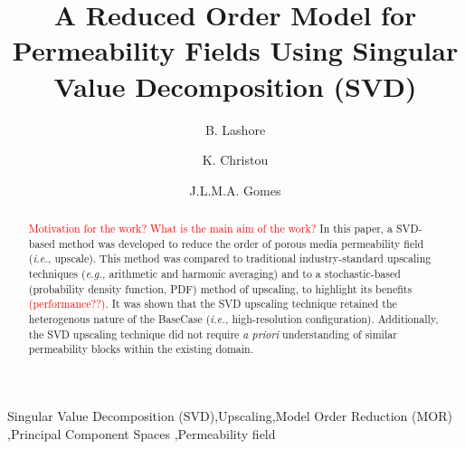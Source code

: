 \documentclass[preprint,12pt]{elsarticle}
\newcommand{\red}{\textcolor{red}}
\newcommand{\eg}{{\it e.g., }}
\newcommand{\ie}{{\it i.e., }}
\begin{document}
\begin{frontmatter}



\title{A Reduced Order Model for Permeability Fields Using Singular Value Decomposition (SVD)}
\author[UoA]{B. Lashore} \author[UoA]{K. Christou} \author[UoA]{J.L.M.A. Gomes}
\address[UoA]{Mechanics of Fluids, Soils \& Structures Research Group \\ School of Engineering, University of Aberdeen, UK}


\begin{abstract}

\red{Motivation for the work? What is the main aim of the work?} In this paper, a SVD-based method was developed to reduce the order of porous media permeability field (\ie upscale). This method was compared to traditional industry-standard upscaling techniques (\eg arithmetic and harmonic averaging) and to a stochastic-based (probability density function, PDF) method of upscaling, to highlight its benefits \red{(performance??)}. It was shown that the SVD upscaling technique retained the heterogenous nature of the BaseCase (\ie high-resolution configuration). Additionally, the SVD upscaling technique did not require {\it a priori} understanding of similar permeability blocks within the existing domain.

\end{abstract}



\begin{keyword} %
Singular Value Decomposition (SVD)\sep Upscaling\sep Model Order Reduction (MOR) \sep  Principal Component Spaces \sep Permeability field
\end{keyword}
 
\end{frontmatter}
\end{document}
